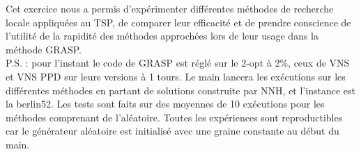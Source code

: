 \documentclass[12pt,a4paper]{article}
\begin{document}
Cet exercice nous a permis d'expérimenter différentes méthodes de recherche locale appliquées au TSP, de comparer leur efficacité et de prendre conscience de l'utilité de la rapidité des méthodes approchées lors de leur usage dans la méthode GRASP.\\

P.S. : pour l'instant le code de GRASP est réglé sur le 2-opt à 2\%, ceux de VNS et VNS PPD sur leurs versions à 1 tours. Le main lancera les exécutions sur les différentes méthodes en partant de solutions construite par NNH, et l'instance est la berlin52. Les tests sont faits sur des moyennes de 10 exécutions pour les méthodes comprenant de l’aléatoire. Toutes les expériences sont reproductibles car le générateur aléatoire est initialisé avec une graine constante au début du main.
\end{document}
